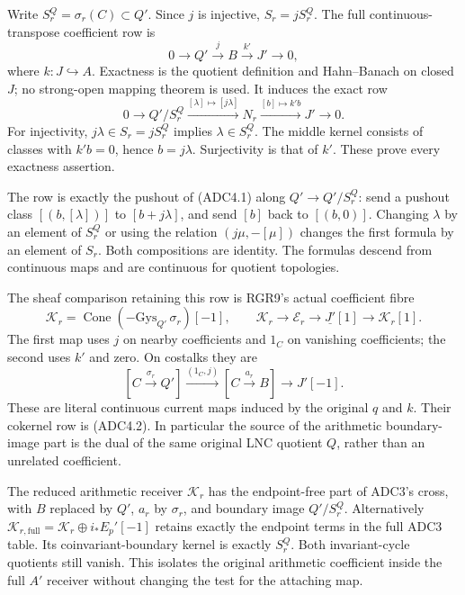 Write \(S_r^Q=\sigma_r(C)\subset Q'\). Since \(j\) is injective,
\(S_r=jS_r^Q\). The full continuous-transpose coefficient row is \[
0\to Q'\xrightarrow jB\xrightarrow{k'}J'\to0,
\tag{ADC4.1}
\] where \(k:J\hookrightarrow A\). Exactness is the quotient definition
and Hahn--Banach on closed \(J\); no strong-open mapping theorem is
used. It induces the exact row \[
0\to Q'/S_r^Q\xrightarrow{[\lambda]\mapsto[j\lambda]}
N_r\xrightarrow{[b]\mapsto k'b}J'\to0.
\tag{ADC4.2}
\] For injectivity, \(j\lambda\in S_r=jS_r^Q\) implies
\(\lambda\in S_r^Q\). The middle kernel consists of classes with
\(k'b=0\), hence \(b=j\lambda\). Surjectivity is that of \(k'\). These
prove every exactness assertion.

The row is exactly the pushout of (ADC4.1) along \(Q'\to Q'/S_r^Q\):
send a pushout class \([(b,[\lambda])]\) to \([b+j\lambda]\), and send
\([b]\) back to \([(b,0)]\). Changing \(\lambda\) by an element of
\(S_r^Q\) or using the relation \((j\mu,-[\mu])\) changes the first
formula by an element of \(S_r\). Both compositions are identity. The
formulas descend from continuous maps and are continuous for quotient
topologies.

The sheaf comparison retaining this row is RGR9's actual coefficient
fibre \[
\mathscr K_r=\operatorname{Cone}(-\mathrm{Gys}_{Q'}\,\sigma_r)[-1],
\qquad
\mathscr K_r\longrightarrow\mathscr E_r
\longrightarrow\underline{J'}[1]\longrightarrow\mathscr K_r[1].
\tag{ADC4.3}
\] The first map uses \(j\) on nearby coefficients and \(1_C\) on
vanishing coefficients; the second uses \(k'\) and zero. On costalks
they are \[
[C\xrightarrow{\sigma_r}Q']\xrightarrow{(1_C,j)}
[C\xrightarrow{a_r}B]\longrightarrow J'[-1].
\tag{ADC4.4}
\] These are literal continuous current maps induced by the original
\(q\) and \(k\). Their cokernel row is (ADC4.2). In particular the
source of the arithmetic boundary-image part is the dual of the same
original LNC quotient \(Q\), rather than an unrelated coefficient.

The reduced arithmetic receiver \(\mathscr K_r\) has the endpoint-free
part of ADC3's cross, with \(B\) replaced by \(Q'\), \(a_r\) by
\(\sigma_r\), and boundary image \(Q'/S_r^Q\). Alternatively
\(\mathscr K_{r,\mathrm{full}}=\mathscr K_r\oplus i_*E_p'[-1]\) retains
exactly the endpoint terms in the full ADC3 table. Its
coinvariant-boundary kernel is exactly \(S_r^Q\). Both invariant-cycle
quotients still vanish. This isolates the original arithmetic
coefficient inside the full \(A'\) receiver without changing the test
for the attaching map.

